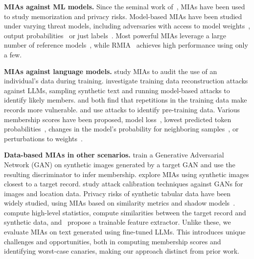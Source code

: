 \textbf{MIAs against ML models.} 
Since the seminal work of~\citet{shokri2017membership}, MIAs have been used to study memorization and privacy risks. 
%
Model-based MIAs have been studied under varying threat models, including adversaries with access to model weights~\citep{sablayrolles2019white,nasr2018comprehensive,leino2020stolen,cretu2023re}, output probabilities~\citep{shokri2017membership,carlini2022membership} or just labels~\citep{choquette2021label}. 
%
Most powerful MIAs leverage a large number of reference models~\citep{ye2022enhanced,carlini2022membership,sablayrolles2019white,watsonimportance}, while RMIA~\citep{zarifzadeh2024low} achieves high performance using only a few.

\textbf{MIAs against language models.} 
\citet{song2019auditing} study MIAs to audit the use of an individual's data during training.
%
\citet{carlini2021extracting} investigate training data reconstruction attacks against LLMs, sampling synthetic text and running model-based attacks to identify likely members.
%
\citet{kandpal2022deduplicating} and \citet{carlini2022quantifying} both find that repetitions in the training data make records more vulnerable. %
%
\citet{shi2024detecting} and \citet{meeus2024did} use attacks to identify pre-training data. 
%
Various membership scores have been proposed, \eg model loss~\citep{yeom2018privacy}, lowest predicted token probabilities~\citep{shi2024detecting}, changes in the model's probability for neighboring samples~\citep{mattern2023membership}, or perturbations to  weights~\citep{li2023mope}.

\textbf{Data-based MIAs in other scenarios.}
\citet{hayes2019logan} train a Generative Adversarial Network (GAN) on synthetic images generated by a target GAN and use the resulting discriminator to infer membership.
%
\citet{hilprecht2019monte} explore MIAs using synthetic images closest to a target record.
%
\citet{chen2020gan} study attack calibration techniques against GANs for images and location data. 
%
Privacy risks of synthetic tabular data have been widely studied, using MIAs based on similarity metrics and shadow models~\citep{yale2019assessing,hyeong2022empirical,zhang2022membership}. 
%
\citet{stadler2022synthetic} compute high-level statistics, \citet{houssiau2022tapas} compute similarities between the target record and synthetic data, and~\citet{meeus2023achilles} propose a trainable feature extractor. 
%
Unlike these, we evaluate MIAs on text generated using fine-tuned LLMs.
This introduces unique challenges and opportunities, both in computing membership scores and identifying worst-case canaries, making our approach distinct from prior work. 

